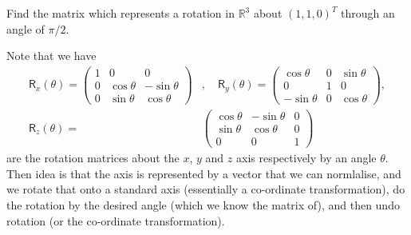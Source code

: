 \documentclass[letter-paper]{tufte-book}
\newenvironment{example}[1][Example]{\begin{trivlist}
\item[\hskip \labelsep {\bfseries #1}]}{\end{trivlist}}
\begin{document}
\begin{example}
  Find the matrix which represents a rotation in $\mathbb{R}^3$ about
  $(1,1,0)^T$ through an angle of $\pi/2$.
  
  Note that we have
  \begin{align*}
    \mathsf{R}_x(\theta) = \begin{pmatrix}1 & 0 & 0 \\ 0 & \cos\theta & -\sin\theta \\ 0 & \sin\theta & \cos\theta\end{pmatrix}&, \quad
    \mathsf{R}_y(\theta) = \begin{pmatrix}\cos\theta & 0 & \sin\theta \\ 0 & 1 & 0 \\ -\sin\theta & 0 & \cos\theta\end{pmatrix}, \\
    \mathsf{R}_z(\theta) = &\begin{pmatrix}\cos\theta & -\sin\theta & 0 \\ \sin\theta & \cos\theta & 0 \\ 0 & 0 & 1\end{pmatrix}
  \end{align*}
  are the rotation matrices about the $x$, $y$ and $z$ axis respectively by an angle $\theta$. Then idea is that the axis is represented by a vector that we can normlalise, and we rotate that onto a standard axis (essentially a co-ordinate transformation), do the rotation by the desired angle (which we know the matrix of), and then undo rotation (or the co-ordinate transformation).
  

\end{example}
\end{document}
